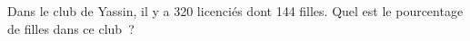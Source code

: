 \documentclass[exercice]{thedocument}%
\begin{document}
%
Dans le club de Yassin, il y a 320 licenciés dont 144 filles.
\vskip5pt\noindent Quel est le pourcentage de filles dans ce club~?
\end{document}
